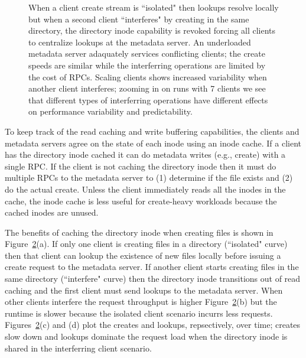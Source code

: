\begin{figure}[t]
\begin{subfigure}[b]{.3\linewidth}
      \caption{}
      \label{fig:batching-outlier}
  \end{subfigure}
  \caption{When a client create stream is ``isolated" then lookups resolve
  locally but when a second client ``interferes" by creating in the same
  directory, the directory inode capability is revoked forcing all clients to
  centralize lookups at the metadata server.  An underloaded metadata server
  adaquately services conflicting clients; the create speeds are similar while
  the interferring operations are limited by the cost of RPCs.  Scaling clients
  shows increased variability when another client interferes; zooming in on runs
  with 7 clients we see that different types of interferring operations have
  different effects on performance variability and predictability.
  \label{fig:throughput-droplease}}
\end{figure}

To keep track of the read caching and write buffering capabilities, the clients
and metadata servers agree on the state of each inode using an inode cache.  If
a client has the directory inode cached it can do metadata writes (e.g.,
create) with a single RPC. If the client is not caching the directory inode
then it must do multiple RPCs to the metadata server to (1) determine if the
file exists and (2) do the actual create.  Unless the client immediately reads
all the inodes in the cache, the inode cache is less useful for create-heavy
workloads because the cached inodes are unused. 

The benefits of caching the directory inode when creating files is shown in
Figure~\ref{fig:throughput-droplease}(a).  If only one client is creating files
in a directory (``isolated" curve) then that client can lookup the existence of
new files locally before issuing a create request to the metadata server. If
another client starts creating files in the same directory (``interfere" curve)
then the directory inode transitions out of read caching and the first client
must send lookups to the metadata server. When other clients interfere the
request throughput is higher Figure~\ref{fig:throughput-droplease}(b) but the
runtime is slower because the isolated client scenario incurrs less requests.
Figures~\ref{fig:throughput-droplease}(c) and (d) plot the creates and lookups,
repsectively, over time; creates slow down and lookups dominate the request
load when the directory inode is shared in the interferring client scenario.

